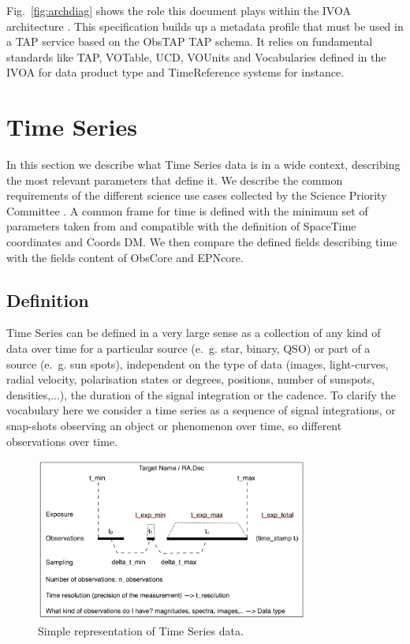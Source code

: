 \documentclass[11pt,a4paper]{ivoa}
\begin{document}
Fig.~\ref{fig:archdiag} shows the role this document plays within the
IVOA architecture \citep{2021ivoa.spec.1101D}. This specification builds up a metadata profile that must be used in a TAP service based on the ObsTAP TAP schema.
It relies on fundamental  standards like TAP, VOTable, UCD, VOUnits and Vocabularies defined in the IVOA  for data product type and TimeReference systems
for instance.


\section{Time Series}
\label{sect:metadata}

In this section we describe what Time Series data is in a wide context, describing the most relevant parameters that define it. We describe the common requirements of the different science use cases collected by the Science Priority Committee \citep{SPC_UC}. A common frame for time is defined with the minimum set of parameters taken from and compatible with the definition of SpaceTime coordinates and Coords DM. We then compare the defined fields describing time with the fields content of ObsCore and EPNcore.

\subsection{Definition}
Time Series can be defined in a very large sense as a collection of any kind of data over time for a particular source (e.~g. star, binary, QSO) or part of a source (e.~g. sun spots), independent on the type of data (images, light-curves, radial velocity, polarisation states or degrees, positions, number of sunspots, densities,...), the duration of the signal integration or the cadence.
To clarify the vocabulary here we consider a time series as a sequence of signal integrations, or snap-shots observing  an object or phenomenon over time, so different observations over time.

\begin{figure}[hbt]
\begin{center}
  \includegraphics[width=0.8\textwidth]{figs/fig1.png}
\caption{Simple representation of Time Series data.}
\label{fig:time-series}
\end{center}
\end{figure}
\end{document}
